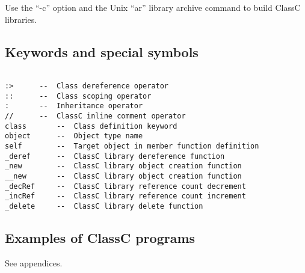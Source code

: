 Use the ``-c'' option and the
Unix ``ar'' library archive command to build ClassC libraries.

\subsection{Keywords and special symbols}
\begin{verbatim}

:>		--	Class dereference operator
::		--	Class scoping operator
:		--	Inheritance operator
//		--	ClassC inline comment operator
class		--	Class definition keyword
object		--	Object type name
self		--	Target object in member function definition
_deref		--	ClassC library dereference function
_new		--	ClassC library object creation function
__new		--	ClassC library object creation function
_decRef		--	ClassC library reference count decrement
_incRef		--	ClassC library reference count increment
_delete		--	ClassC library delete function

\end{verbatim}

\subsection{Examples of ClassC programs}
See appendices.

